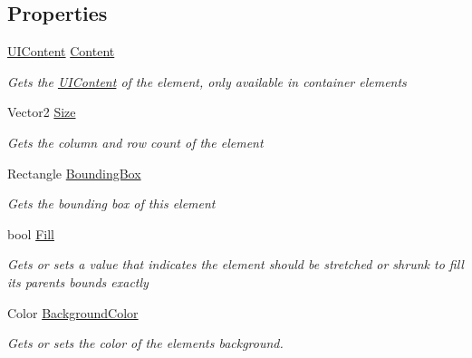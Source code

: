 \subsection*{Properties}
\begin{DoxyCompactItemize}
\item 
\hyperlink{class_m_b2_d_1_1_u_i_1_1_u_i_content}{U\+I\+Content} \hyperlink{class_m_b2_d_1_1_u_i_1_1_u_i_element_aa8ea5b853315a074a1a745c54c83404f}{Content}
\begin{DoxyCompactList}\small\item\em Gets the \hyperlink{class_m_b2_d_1_1_u_i_1_1_u_i_content}{U\+I\+Content} of the element, only available in container elements \end{DoxyCompactList}\item 
Vector2 \hyperlink{class_m_b2_d_1_1_u_i_1_1_u_i_element_a0de3ac5ae7a1377b62677a9aeae8955e}{Size}
\begin{DoxyCompactList}\small\item\em Gets the column and row count of the element \end{DoxyCompactList}\item 
Rectangle \hyperlink{class_m_b2_d_1_1_u_i_1_1_u_i_element_a840da120eb79b7ce0382e6c0a9d0a482}{Bounding\+Box}
\begin{DoxyCompactList}\small\item\em Gets the bounding box of this element \end{DoxyCompactList}\item 
bool \hyperlink{class_m_b2_d_1_1_u_i_1_1_u_i_element_a4bd0871f3e17f95b35aef3f3292bd89e}{Fill}
\begin{DoxyCompactList}\small\item\em Gets or sets a value that indicates the element should be stretched or shrunk to fill its parents bounds exactly \end{DoxyCompactList}\item 
Color \hyperlink{class_m_b2_d_1_1_u_i_1_1_u_i_element_abcd3eabd4db0998955a1e856a41d3d84}{Background\+Color}
\begin{DoxyCompactList}\small\item\em Gets or sets the color of the elements background. \end{DoxyCompactList}\item 

\end{DoxyCompactItemize}
